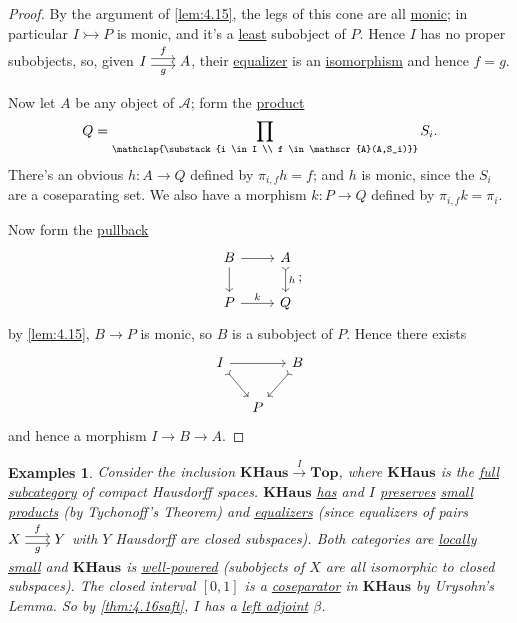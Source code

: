 \documentclass{article}
\newenvironment{tikzcdi}{\begin{tikzcd}[cramped, sep=scriptsize]}{\end{tikzcd}}
\newtheorem{nexample}[nthm]{Examples}
\begin{document}
\begin{proof}
  By the argument of \cref{lem:4.15}, the legs of this cone are all \hyperlink{def:monic}{monic}; in particular $I \rightarrowtail P$ is monic, and it's a \hyperlink{def:subobj}{least} subobject of $P$.
  Hence $I$ has no proper subobjects,
  so, given $\begin{tikzcdi}I \rar[shift left]{f} \rar[shift right,']{g} & A\end{tikzcdi}$, their \hyperlink{def:equalizer}{equalizer} is an \hyperlink{def:iso}{isomorphism} and hence $f = g$.

  Now let $A$ be any object of $\mathscr{A}$; form the \hyperlink{def:lprod}{product}
  \begin{equation*}
    Q = \prod_{\mathclap{\substack{i \in I \\ f \in \mathscr{A}(A,S_i)}}} S_i.
  \end{equation*}
  There's an obvious $h: A \to Q$ defined by $\pi_{i,f} h = f$; and $h$ is monic, since the $S_i$ are a coseparating set.
  We also have a morphism $k : P \to Q$ defined by $\pi_{i,f} k = \pi_i$.

  Now form the \hyperlink{def:pullback}{pullback}
  \begin{equation*}
    \begin{tikzcd}
      B \rar \dar & A \dar[tail]{h} \\ P \rar{k} & Q
    \end{tikzcd};
  \end{equation*}
  by \cref{lem:4.15}, $B \to P$ is monic, so $B$ is a subobject of $P$.
  Hence there exists
  \begin{equation*}
    \begin{tikzcd}[column sep=small]
      I \arrow[rr] \drar[tail] && B \arrow[dl, tail] \\
                               & P
    \end{tikzcd}
  \end{equation*}
  and hence a morphism $I \to B \to A$.
\end{proof}
\begin{nexample}\label{eg:4.17}
  Consider the inclusion $\mathbf{KHaus} \xrightarrow{I} \mathbf{Top}$, where $\mathbf{KHaus}$ is the \hyperlink{def:fulls}{full subcategory} of compact Hausdorff spaces.
  $\mathbf{KHaus}$ \hyperlink{def:haslimits}{has} and $I$ \hyperlink{def:plim}{preserves} \hyperlink{def:small}{small} \hyperlink{def:lprod}{products} (by Tychonoff's Theorem) and \hyperlink{def:equalizer}{equalizers} (since equalizers of pairs $\begin{tikzcdi}X \rar[shift left]{f} \rar[shift right,']{g} & Y\end{tikzcdi}$ with $Y$ Hausdorff are closed subspaces).
  Both categories are \hyperlink{def:lsmall}{locally small} and $\mathbf{KHaus}$ is \hyperlink{def:wp}{well-powered} (subobjects of $X$ are all isomorphic to closed subspaces).
  The closed interval $[0,1]$ is a \hyperlink{def:separating}{coseparator} in $\mathbf{KHaus}$ by Urysohn's Lemma.
  So by \cref{thm:4.16saft}, $I$ has a \hyperlink{def:adj}{left adjoint} $\beta$.
\end{nexample}
\end{document}

